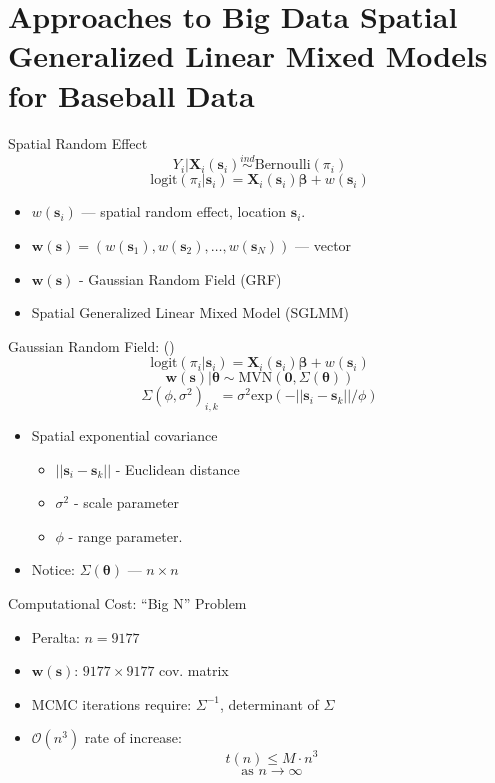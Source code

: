 \documentclass{beamer}
\begin{document}
\section{Approaches to Big Data Spatial Generalized Linear Mixed Models for Baseball Data}

\begin{frame}{Spatial Random Effect}{}
$$ Y_{i}|\mathbf{X}_{i}(\mathbf{s}_{i}) \stackrel{ind}{\sim} \mbox{Bernoulli}(\pi_{i}) $$
$$\text{logit}(\pi_{i}|\pmb{s}_{i}) = \mathbf{X}_{i}(\mathbf{s}_{i})\pmb{\beta} + w(\pmb{s}_{i}) $$
\begin{itemize}
\addtolength{\itemsep}{0.5\baselineskip}
\item $w(\pmb{s}_{i})$ --- spatial random effect, location $\pmb{s}_{i}$.
\item $\pmb{w}(\pmb{s}) = (w(\pmb{s}_{1}), w(\pmb{s}_{2}), \dots, w(\pmb{s}_{N}))$ --- vector
\item $\pmb{w}(\pmb{s})$ - Gaussian Random Field (GRF)
\item Spatial Generalized Linear Mixed Model (SGLMM)
\end{itemize}

\end{frame}

\begin{frame}{Gaussian Random Field: ()}{} %
$$\text{logit}(\pi_{i}|\pmb{s}_{i}) = \mathbf{X}_{i}(\mathbf{s}_{i})\pmb{\beta} + w(\pmb{s}_{i}) $$
$$\pmb{w}(\pmb{s}) | \pmb{\theta} \sim \text{MVN}(\pmb{0}, \Sigma(\pmb{\theta}))$$
$$\Sigma(\phi, \sigma^{2})_{i,k} = \sigma^{2} \text{exp}(-||\pmb{s}_{i} - \pmb{s}_{k}||/\phi)$$
\begin{itemize}
\addtolength{\itemsep}{0.5\baselineskip}
\item Spatial exponential covariance
  \begin{itemize}
  \addtolength{\itemsep}{0.5\baselineskip}
  \item $||\pmb{s}_{i} - \pmb{s}_{k}||$ - Euclidean distance
  \item $\sigma^{2}$ - scale parameter
  \item $\phi$ - range parameter.
  \end{itemize}
\item Notice: $\Sigma(\pmb{\theta})$ --- $n \times n$
\end{itemize}

\end{frame}


\begin{frame}{Computational Cost: ``Big N'' Problem}{}
\begin{itemize}
\addtolength{\itemsep}{0.5\baselineskip}
\item Peralta: $n = 9177$
\item $\pmb{w}(\pmb{s})$: $9177 \times 9177$ cov. matrix
\item MCMC iterations require: $\Sigma^{-1}$, determinant of $\Sigma$
\item $\mathcal{O}(n^{3})$ rate of increase: 
$$t(n) \leq M \cdot n^{3}$$ 
$$ \text{as } n \rightarrow \infty$$
\end{itemize}
\end{frame}
\end{document}
